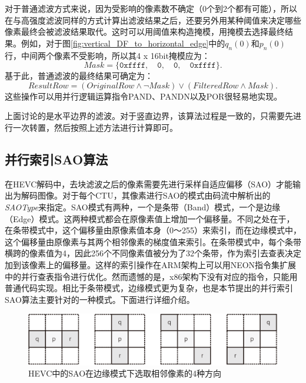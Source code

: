 对于普通滤波方式来说，因为受影响的像素数不确定（0个到2个都有可能），所以在与高强度滤波同样的方式计算出滤波结果之后，还要另外用某种阈值来决定哪些像素最终会被滤波结果取代。这时可以用阈值来构造掩模，用掩模去选择最终结果。例如，对于图\ref{fig:vertical_DF_to_horizontal_edge}中的$q_n(0)$和$p_n(0)$行，中间两个像素不受影响，所以其4 x 16bit掩模应为：
\begin{equation}
Mask = \{ \texttt{0xffff}, \quad \texttt{0}, \quad \texttt{0}, \quad \texttt{0xffff} \}.
\end{equation}
基于此，普通滤波的最终结果可确定为：
\begin{equation}
ResultRow = (OriginalRow \land \neg Mask ) \lor (FilteredRow \land Mask).
\end{equation}
这些操作可以用并行逻辑运算指令PAND、PANDN以及POR很轻易地实现。

上面讨论的是水平边界的滤波。对于竖直边界，该算法过程是一致的，只需要先进行一次转置，然后按照上述方法进行计算即可。

\subsection{并行索引SAO算法}

在HEVC解码中，去块滤波之后的像素需要先进行采样自适应偏移（SAO）才能输出为解码图像。对于每个CTU，其像素进行SAO的模式由码流中解析出的\textit{SAOType}来指定。SAO模式有两种，一个是条带（Band）模式，一个是边缘（Edge）模式。这两种模式都会在原像素值上增加一个偏移量。不同之处在于，在条带模式中，这个偏移量由原像素值本身（0～255）来索引，而在边缘模式中，这个偏移量由原像素与其两个相邻像素的梯度值来索引。在条带模式中，每个条带横跨的像素值为4，因此256个不同像素值被分为了32个条带，作为索引去查表决定加到该像素上的偏移量。这样的索引操作在ARM架构上可以用NEON指令集扩展中的并行查表指令进行优化。然而遗憾的是，x86架构下没有对应的指令，只能用普通代码实现。相比于条带模式，边缘模式更为复杂，也是本节提出的并行索引SAO算法主要针对的一种模式。下面进行详细介绍。

\begin{figure}[t]
	\centering
	\includegraphics[width = 0.9\linewidth]{eps/SAO_edge_direction}
	\caption{\label{fig:SAO_edge_direction}HEVC中的SAO在边缘模式下选取相邻像素的4种方向}
\end{figure}

